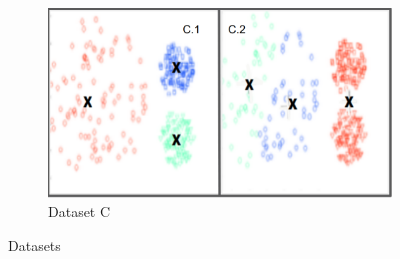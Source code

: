 \documentclass[12pt]{article}
\begin{document}
\begin{figure}[H]
        \begin{center}
        \begin{subfigure}{.6\textwidth}
            \includegraphics[width=\linewidth]{figures/d32.png}
            \caption{Dataset C}
            \label{fig:sfig3}
        \end{subfigure}   
        \end{center}
     
     
         \caption{Datasets}
          \label{fig:KMeans}
       
        \end{figure}
\newpage
\end{document}
